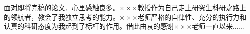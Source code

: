 面对即将完稿的论文，心里感触良多。$\times\times\times$教授作为自己走上研究生科研之路上的领航者，教会了我独立思考的能力。$\times\times\times$老师严格的自律性、充分的执行力和认真的科研态度为我起到了标杆的作用。借此由衷的感谢$\times\times\times$老师一直以来......